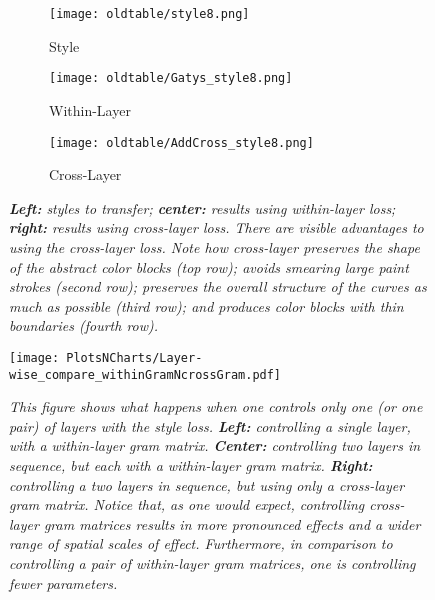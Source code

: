 \documentclass[runningheads]{llncs}
\begin{document}
\begin{figure}[!htbp]
  \begin{subfigure}[b]{0.3\linewidth}
    \texttt{[image: oldtable/style8.png]}
\caption{Style}
  \end{subfigure}
  \begin{subfigure}[b]{0.3\linewidth}
    \texttt{[image: oldtable/Gatys\_style8.png]}
\caption{Within-Layer}
  \end{subfigure}
  \begin{subfigure}[b]{0.3\linewidth}
    \texttt{[image: oldtable/AddCross\_style8.png]}
\caption{Cross-Layer}
  \end{subfigure} 
    \caption{\em {\bf Left:} styles to transfer; {\bf center:} results using within-layer
    loss; {\bf right:} results using cross-layer loss.  There are
    visible advantages to using the cross-layer loss. Note how cross-layer preserves the shape of the abstract color blocks (top row); 
avoids smearing large paint strokes (second row); preserves the overall structure of the curves as much as possible
(third row); and produces color blocks with thin boundaries (fourth row).
  }\label{fig:cf2}
\end{figure}

\begin{figure}[h]
\centering


\texttt{[image: PlotsNCharts/Layer-wise\_compare\_withinGramNcrossGram.pdf]}

\caption{\em This figure shows what happens when one controls only one (or one pair) of layers with the style loss.
{\bf Left:} controlling a single layer, with a within-layer gram matrix.  {\bf Center:} controlling two
layers in sequence, but each with a within-layer gram matrix.  {\bf Right:} controlling a two layers
in sequence, but using only a cross-layer gram matrix.  Notice that, as one would expect, controlling
cross-layer gram matrices results in more pronounced effects and a wider range of spatial scales of effect.
Furthermore, in comparison to controlling  a pair of within-layer gram matrices, one is controlling fewer
parameters.}
\label{fig:layer_wise}
\end{figure}
\end{document}

